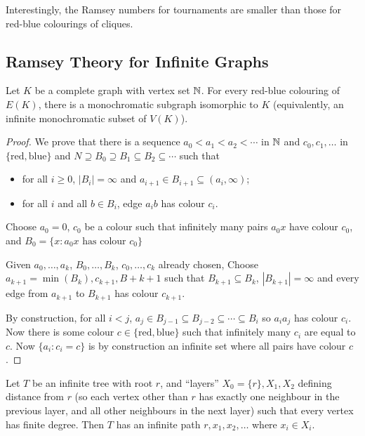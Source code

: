 \documentclass[main.tex]{subfiles}
\begin{document}
Interestingly, the Ramsey numbers for tournaments are smaller than those
for red-blue colourings of cliques.

\subsection{Ramsey Theory for Infinite Graphs}
\begin{theorem}
  Let $K$ be a complete graph with vertex set $\mathbb N$.
  For every red-blue colouring of $E(K)$, there is a monochromatic subgraph
  isomorphic to $K$ (equivalently, an infinite monochromatic subset of $V(K)$).
\end{theorem}
\begin{proof}
  We prove that there is a sequence $a_0 < a_1 < a_2 < \cdots$ in $\mathbb N$ and
  $c_0,c_1,\ldots$ in $\{\text{red}, \text{blue}\}$ and
  $N\supseteq B_0\supseteq B_1\subseteq B_2\subseteq\cdots$ such that
  \begin{itemize}
    \item for all $i\geq 0$, $|B_i| = \infty$ and $a_{i+1}\in B_{i+1}\subseteq(a_i,\infty)$;
    \item for all $i$ and all $b\in B_i$, edge $a_ib$ has colour $c_i$.
  \end{itemize}
  Choose $a_0 = 0$, $c_0$ be a colour such that infinitely many pairs $a_0x$
  have colour $c_0$, and $B_0 = \{x : a_0x\text{ has colour }c_0\}$

  Given $a_0,\ldots,a_k$, $B_0,\ldots,B_k$, $c_0,\ldots,c_k$ already chosen,
  Choose $a_{k+1} = \min(B_k), c_{k+1}, B+{k+1}$ such that $B_{k+1}\subseteq B_k$,
  $|B_{k+1}| = \infty$ and every edge from $a_{k+1}$ to $B_{k+1}$ has colour $c_{k+1}$.

  By construction, for all $i < j$,
  $a_j\in B_{j-1}\subseteq B_{j-2}\subseteq\cdots\subseteq B_i$
  so $a_ia_j$ has colour $c_i$.
  Now there is some colour $c\in\{\text{red},\text{blue}\}$ such that infinitely
  many $c_i$ are equal to $c$.
  Now $\{a_i : c_i = c\}$ is by construction an infinite set where all pairs
  have colour $c$.
\end{proof}
\begin{theorem}
  Let $T$ be an infinite tree with root $r$, and ``layers''
  $X_0 = \{r\}, X_1, X_2$ defining distance from $r$ (so each vertex other than
  $r$ has exactly one neighbour in the previous layer, and all other neighbours
  in the next layer) such that every vertex has finite degree.
  Then $T$ has an infinite path $r, x_1, x_2,\ldots$ where $x_i\in X_i$.
\end{theorem}
\end{document}
